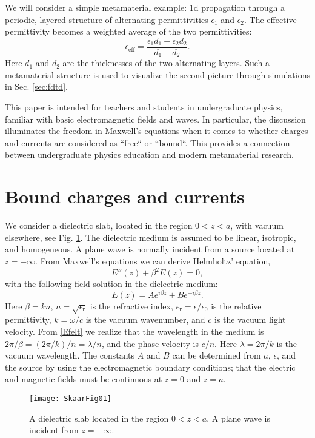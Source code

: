 \documentclass[prb,twocolumn]{revtex4-1}
\newcommand{\be}{\begin{equation}}
\newcommand{\ee}{\end{equation}}
\begin{document}
We will consider a simple metamaterial example: 1d propagation through a periodic, layered structure \cite{saleh} of alternating permittivities $\epsilon_1$ and $\epsilon_2$. The effective permittivity becomes a weighted average of the two permittivities:
\begin{equation}\label{epseff}
   \epsilon_\text{eff} = \frac{\epsilon_1d_1 + \epsilon_2 d_2}{d_1 + d_2}.
\end{equation}
Here $d_1$ and $d_2$ are the thicknesses of the two alternating layers. Such a metamaterial structure is used to visualize the second picture through simulations in Sec. \ref{sec:fdtd}. 

This paper is intended for teachers and students in undergraduate physics, familiar with basic electromagnetic fields and waves. In particular, the discussion illuminates the freedom in Maxwell's equations when it comes to whether charges and currents are considered as ``free`` or ``bound``. This provides a connection between undergraduate physics education and modern metamaterial research.

\section{Bound charges and currents}\label{sec:bound}
We consider a dielectric slab, located in the region $0<z<a$, with vacuum elsewhere, see Fig. \ref{fig:slab}. The dielectric medium is assumed to be linear, isotropic, and homogeneous. A plane wave is normally incident from a source located at $z=-\infty$. From Maxwell's equations we can derive Helmholtz' equation,
\be
E''(z)+\beta^2 E(z) = 0,
\ee
with the following field solution in the dielectric medium:
\be\label{Efelt}
E(z)=Ae^{i\beta z}+Be^{-i\beta z}.
\ee
Here $\beta=kn$, $n=\sqrt{\epsilon_\text{r}}$ is the refractive index, $\epsilon_\text{r}=\epsilon/\epsilon_0$ is the relative permittivity, $k=\omega/c$ is the vacuum wavenumber, and $c$ is the vacuum light velocity. From \eqref{Efelt} we realize that the wavelength in the medium is $2\pi/\beta=(2\pi/k)/n=\lambda/n$, and the phase velocity is $c/n$. Here $\lambda=2\pi/k$ is the vacuum wavelength. The constants $A$ and $B$ can be determined from $a$, $\epsilon$, and the source by using the electromagnetic boundary conditions; that the electric and magnetic fields must be continuous at $z=0$ and $z=a$. 
\begin{figure}
\begin{center}
\texttt{[image: SkaarFig01]}
\caption{A dielectric slab located in the region $0<z<a$. A plane wave is incident from $z=-\infty$.}
\label{fig:slab}
\end{center}
\end{figure}
\end{document}
